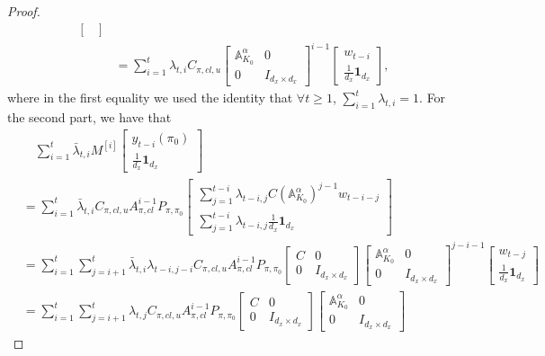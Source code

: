 \begin{proof}
\begin{align*}
\begin{bmatrix}
\end{bmatrix}\\
&=\sum_{i=1}^t \lambda_{t,i} C_{\pi,cl,u} \begin{bmatrix}
    \mathbb{A}_{K_0}^{\alpha} & 0 \\ 0 & I_{d_x\times d_x}
\end{bmatrix}^{i-1} \begin{bmatrix}
    w_{t-i} \\ \frac{1}{d_x}\mathbf{1}_{d_x}
\end{bmatrix},
\end{align*}
where in the first equality we used the identity that $\forall t\ge 1$, $\sum_{i=1}^{t}\lambda_{t,i}=1$.
For the second part, we have that
\begin{align*}    
& \quad \sum_{i=1}^t\bar{\lambda}_{t,i}M^{[i]}\begin{bmatrix}
    y_{t-i}(\pi_0) \\
    \frac{1}{d_x}\mathbf{1}_{d_x}
\end{bmatrix}\\
&= \sum_{i=1}^t \bar{\lambda}_{t,i} C_{\pi,cl,u} A_{\pi,cl}^{i-1} P_{\pi,\pi_0} \begin{bmatrix}
    \sum_{j=1}^{t-i} \lambda_{t-i,j}C (\mathbb{A}_{K_0}^{\alpha})^{j-1} w_{t-i-j} \\ \sum_{j=1}^{t-i} \lambda_{t-i,j} \frac{1}{d_x}\mathbf{1}_{d_x}
\end{bmatrix}\\
&=\sum_{i=1}^t \sum_{j=i+1}^t \bar{\lambda}_{t,i} \lambda_{t-i,j-i} C_{\pi,cl,u} A_{\pi,cl}^{i-1} P_{\pi,\pi_0} \begin{bmatrix}
    C & 0 \\ 0 & I_{d_x\times d_x}
\end{bmatrix} \begin{bmatrix}
    \mathbb{A}_{K_0}^{\alpha} & 0 \\ 0 & I_{d_x\times d_x}
\end{bmatrix}^{j-i-1} \begin{bmatrix}
    w_{t-j} \\ \frac{1}{d_x}\mathbf{1}_{d_x}
\end{bmatrix}\\
&= \sum_{i=1}^t \sum_{j=i+1}^t \lambda_{t,j} C_{\pi,cl,u} A_{\pi,cl}^{i-1} P_{\pi,\pi_0} \begin{bmatrix}
    C & 0 \\ 0 & I_{d_x\times d_x}
\end{bmatrix} \begin{bmatrix}
    \mathbb{A}_{K_0}^{\alpha} & 0 \\ 0 & I_{d_x\times d_x}

\end{bmatrix}
\end{align*}
\end{proof}
